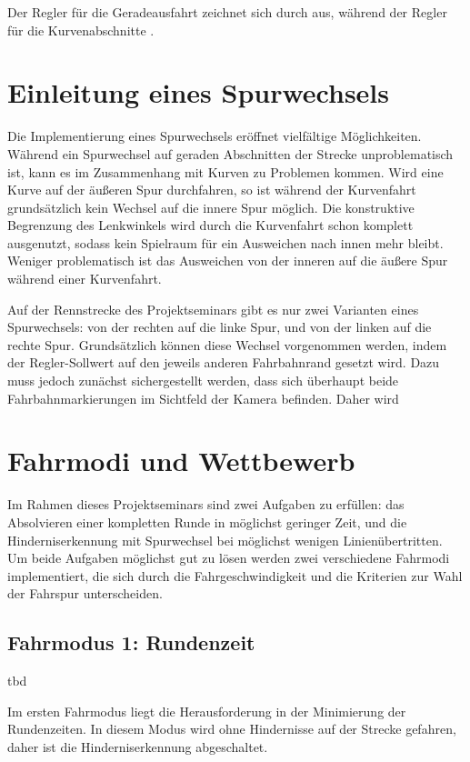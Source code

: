 Der Regler für die Geradeausfahrt zeichnet sich durch  aus, während der Regler für die Kurvenabschnitte .


\section{Einleitung eines Spurwechsels}
\label{sec:spurwechsel}

Die Implementierung eines Spurwechsels eröffnet vielfältige Möglichkeiten. Während ein Spurwechsel auf geraden Abschnitten der Strecke unproblematisch ist, kann es im Zusammenhang mit Kurven zu Problemen kommen. Wird eine Kurve auf der äußeren Spur durchfahren, so ist während der Kurvenfahrt grundsätzlich kein Wechsel auf die innere Spur möglich. Die konstruktive Begrenzung des Lenkwinkels wird durch die Kurvenfahrt schon komplett ausgenutzt, sodass kein Spielraum für ein Ausweichen nach innen mehr bleibt. Weniger problematisch ist das Ausweichen von der inneren auf die äußere Spur während einer Kurvenfahrt.

Auf der Rennstrecke des Projektseminars gibt es nur zwei Varianten eines Spurwechsels: von der rechten auf die linke Spur, und von der linken auf die rechte Spur. Grundsätzlich können diese Wechsel vorgenommen werden, indem der Regler-Sollwert auf den jeweils anderen Fahrbahnrand gesetzt wird. Dazu muss jedoch zunächst sichergestellt werden, dass sich überhaupt beide Fahrbahnmarkierungen im Sichtfeld der Kamera befinden. Daher wird 


\section{Fahrmodi und Wettbewerb}
\label{sec:fahrmodi}

Im Rahmen dieses Projektseminars sind zwei Aufgaben zu erfüllen: das Absolvieren einer kompletten Runde in möglichst geringer Zeit, und die Hinderniserkennung mit Spurwechsel bei möglichst wenigen Linienübertritten. Um beide Aufgaben möglichst gut zu lösen werden zwei verschiedene Fahrmodi implementiert, die sich durch die Fahrgeschwindigkeit und die Kriterien zur Wahl der Fahrspur unterscheiden.

\subsection{Fahrmodus 1: Rundenzeit}

tbd

Im ersten Fahrmodus liegt die Herausforderung in der Minimierung der Rundenzeiten. In diesem Modus wird ohne Hindernisse auf der Strecke gefahren, daher ist die Hinderniserkennung abgeschaltet.

